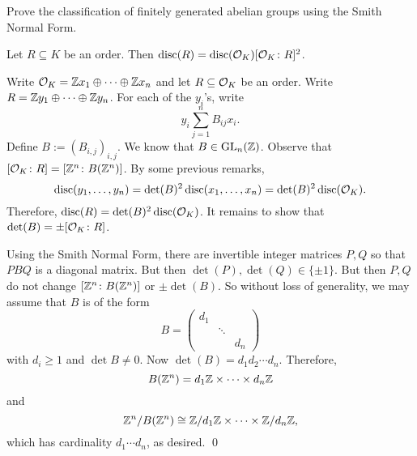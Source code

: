  Prove the classification of finitely generated abelian groups using the Smith Normal Form. \\


\begin{lem} \label{lem:disc_ordersq}
Let $R \subseteq K$ be an order. Then $\operatorname{disc}(R)= \operatorname{disc}(\mathcal{O}_K) [\mathcal{O}_K \colon R]^2$. 
\end{lem}

\pf Write $\mathcal{O}_K= \mathbb{Z} x_1 \oplus \cdots \oplus \mathbb{Z} x_n$ and let $R \subseteq \mathcal{O}_K$ be an order. Write $R= \mathbb{Z} y_1 \oplus \cdots \oplus \mathbb{Z} y_n$. For each of the $y_i$'s, write
	\[
	y_i \sum_{j=1}^n B_{ij} x_i.
	\]
Define $B:= (B_{i,j})_{i,j}$. We know that $B \in \operatorname{GL}_n(\mathbb{Z})$. Observe that $[\mathcal{O}_K \colon R] = [\mathbb{Z}^n \colon B(\mathbb{Z}^n)]$. By some previous remarks,
	\[
	\operatorname{disc}(y_1, \ldots, y_n)= \det(B)^2 \operatorname{disc}(x_1, \ldots, x_n)= \det(B)^2 \operatorname{disc}(\mathcal{O}_K).
	\]
Therefore, $\operatorname{disc}(R)= \det(B)^2 \operatorname{disc}(\mathcal{O}_K)$. It remains to show that $\det(B)= \pm [\mathcal{O}_K \colon R]$. 

Using the Smith Normal Form, there are invertible integer matrices $P, Q$ so that $PBQ$ is a diagonal matrix. But then $\det(P), \det(Q) \in \{\pm 1\}$. But then $P,Q$ do not change $[\mathbb{Z}^n \colon B(\mathbb{Z}^n)]$ or $\pm\det(B)$. So without loss of generality, we may assume that $B$ is of the form
	\[
	B= \begin{pmatrix} d_1 & & \\ & \ddots & \\ & & d_n \end{pmatrix}
	\]
with $d_i \geq 1$ and $\det B \neq 0$. Now $\det(B)= d_1 d_2 \cdots d_n$. Therefore,
	\[
	B(\mathbb{Z}^n)= d_1 \mathbb{Z} \times \cdots \times d_n \mathbb{Z}
	\]
and
	\[
	\mathbb{Z}^n/B(\mathbb{Z}^n) \cong \mathbb{Z}/d_1\mathbb{Z} \times \cdots \times \mathbb{Z}/d_n\mathbb{Z},
	\]
which has cardinality $d_1 \cdots d_n$, as desired. \qed \pskip


